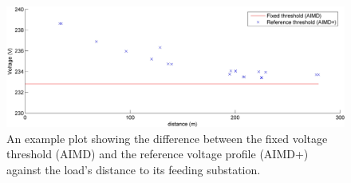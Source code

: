 \begin{figure}\centering
	\includegraphics{_chapter4/fig/ref-voltage-difference}
	\caption{An example plot showing the difference between the fixed voltage threshold (AIMD) and the reference voltage profile (AIMD+) against the load's distance to its feeding substation.}
	\label{ch4:fig:ref-voltage-difference}
\end{figure}